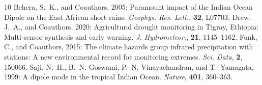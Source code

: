 \documentclass{article}
\begin{document}

\begin{thebibliography}{10}
Behera, S.~K., and Coauthors, 2005: Paramount impact of the Indian Ocean Dipole on the East African short rains. \textit{Geophys. Res. Lett.}, \textbf{32}, L07703.
Drew, J.~A., and Coauthors, 2020: Agricultural drought monitoring in Tigray, Ethiopia: Multi-sensor synthesis and early warning. \textit{J. Hydrometeor.}, \textbf{21}, 1145--1162.
Funk, C., and Coauthors, 2015: The climate hazards group infrared precipitation with stations: A new environmental record for monitoring extremes. \textit{Sci. Data}, \textbf{2}, 150066.
Saji, N.~H., B.~N. Goswami, P.~N. Vinayachandran, and T.~Yamagata, 1999: A dipole mode in the tropical Indian Ocean. \textit{Nature}, \textbf{401}, 360--363.
\end{thebibliography}
\end{document}

